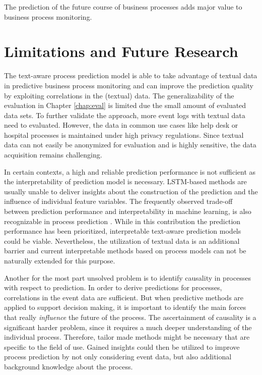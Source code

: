 The prediction of the future course of business processes adds major value to business process monitoring.  

\section{Limitations and Future Research}

The text-aware process prediction model is able to take advantage of textual data in predictive business process monitoring and can improve the prediction quality by exploiting correlations in the (textual) data.
The generalizability of the evaluation in Chapter \ref{chap:eval} is limited due the small amount of evaluated data sets.
To further validate the approach, more event logs with textual data need to evaluated.
However, the data in common use cases like help desk or hospital processes is maintained under high privacy regulations.
Since textual data can not easily be anonymized for evaluation and is highly sensitive, the data acquisition remains challenging.

In certain contexts, a high and reliable prediction performance is not sufficient as the interpretability of prediction model is necessary.
LSTM-based methods are usually unable to deliver insights about the construction of the prediction and the influence of individual feature variables.
The frequently observed trade-off between prediction performance and interpretability in machine learning, is also recognizable in process prediction \cite{DBLP:journals/sosym/TaxTZ20}.
While in this contribution the prediction performance has been prioritized, interpretable text-aware prediction models could be viable.
Nevertheless, the utilization of textual data is an additional barrier and current interpretable methods based on process models can not be naturally extended for this purpose.

Another for the most part unsolved problem is to identify causality in processes with respect to prediction.
In order to derive predictions for processes, correlations in the event data are sufficient.
But when predictive methods are applied to support decision making, it is important to identify the main forces that really \textit{influence} the future of the process.
The ascertainment of causality is a significant harder problem, since it requires a much deeper understanding of the individual process.
Therefore, tailor made methods might be necessary that are specific to the field of use.
Gained insights could then be utilized to improve process prediction by not only considering event data, but also additional background knowledge about the process.

